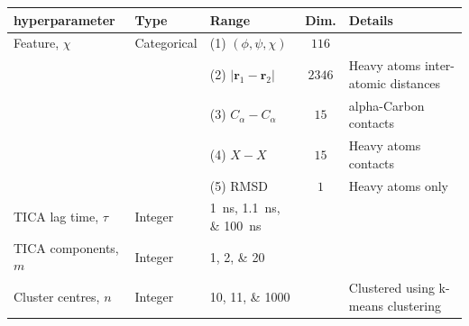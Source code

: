 \begin{table}
    \centering
    \begin{tabularx}{0.9\textwidth}{ |>{\raggedright\arraybackslash}l|l|>{\raggedright\arraybackslash}X|c| >{\raggedright\arraybackslash}X | } 
    \hline
    \textbf{hyperparameter} & \textbf{Type} & \textbf{Range} & \textbf{Dim.} &\textbf{Details} \\
     \hline\hline
    Feature, $\chi$ & Categorical & (1) $(\phi, \psi, \chi)$ & $\num{116}$  & \\
    & & (2) $|\mathbf{r}_{1}-\mathbf{r}_{2}|$  & $\num{ 2346}$& Heavy atoms inter-atomic distances \\
    & & (3) $C_{\alpha}-C_{\alpha}$ & $\num{15}$ & alpha-Carbon contacts\\ 
    & & (4) $X-X$  & $\num{15}$ & Heavy atoms contacts\\ 
    & & (5) RMSD & $\num{1}$ &  Heavy atoms only\\ 
    \hline
    TICA lag time, $\tau$ & Integer &\SIlist[list-final-separator = { ... }]{1;1.1;100}{ns} &  & \\
    \hline
    TICA components, $m$& Integer &\numlist[list-final-separator = { ... }]{1;2;20} & & \\
    \hline
    Cluster centres, $n$ & Integer & \numlist[list-final-separator = { ... }]{10;11;1000}& &  Clustered using k-means clustering  \\
    
     \hline
    \end{tabularx}
    \label{tab:aadh_searchspace}
\end{table}

